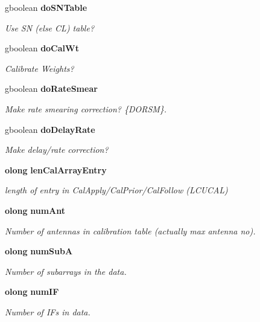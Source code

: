 \begin{CompactItemize}
gboolean {\bf do\-SNTable}
\begin{CompactList}\small\item\em Use SN (else CL) table? \item\end{CompactList}\item 
gboolean {\bf do\-Cal\-Wt}
\begin{CompactList}\small\item\em Calibrate Weights? \item\end{CompactList}\item 
gboolean {\bf do\-Rate\-Smear}
\begin{CompactList}\small\item\em Make rate smearing correction? \{DORSM\}. \item\end{CompactList}\item 
gboolean {\bf do\-Delay\-Rate}
\begin{CompactList}\small\item\em Make delay/rate correction? \item\end{CompactList}\item 
{\bf olong} {\bf len\-Cal\-Array\-Entry}
\begin{CompactList}\small\item\em length of entry in Cal\-Apply/Cal\-Prior/Cal\-Follow (LCUCAL) \item\end{CompactList}\item 
{\bf olong} {\bf num\-Ant}
\begin{CompactList}\small\item\em Number of antennas in calibration table (actually max antenna no). \item\end{CompactList}\item 
{\bf olong} {\bf num\-Sub\-A}
\begin{CompactList}\small\item\em Number of subarrays in the data. \item\end{CompactList}\item 
{\bf olong} {\bf num\-IF}
\begin{CompactList}\small\item\em Number of IFs in data. \item\end{CompactList}\item 

\end{CompactItemize}

